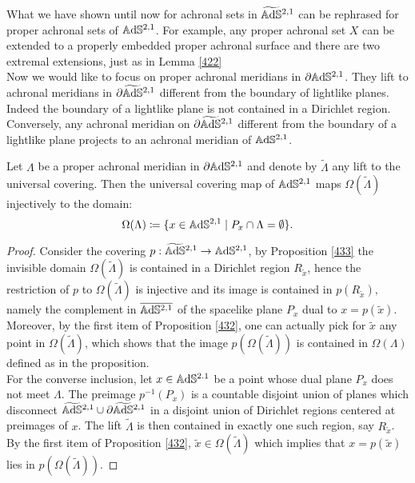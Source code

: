 What we have shown until now for achronal sets in $\widetilde{\mathbb{A}\mathrm{d}\mathbb{S}}{}^{2,1}$ can be rephrased for proper achronal sets of $\mathbb{A}\mathrm{d}\mathbb{S}^{2,1}$. For example, any proper achronal set $X$ can be extended to a properly embedded proper achronal surface and there are two extremal extensions, just as in Lemma \ref{422}\\
Now we would like to focus on proper achronal meridians in $\partial\mathbb{A}\mathrm{d}\mathbb{S}^{2,1}$. They lift to achronal meridians in $\partial\widetilde{\mathbb{A}\mathrm{d}\mathbb{S}}{}^{2,1}$ different from the boundary of lightlike planes. Indeed the boundary of a lightlike plane is not contained in a Dirichlet region. Conversely, any achronal meridian on $\partial\widetilde{\mathbb{A}\mathrm{d}\mathbb{S}}{}^{2,1}$ different from the boundary of a lightlike plane projects to an achronal meridian of $\mathbb{A}\mathrm{d}\mathbb{S}^{2,1}$.

\begin{proposition}\label{453}
    Let $\Lambda$ be a proper achronal meridian in $\partial\mathbb{A}\mathrm{d}\mathbb{S}^{2,1}$ and denote by $\widetilde{\Lambda}$ any lift to the universal covering. Then the universal covering map of $\mathbb{A}\mathrm{d}\mathbb{S}^{2,1}$ maps $\Omega(\widetilde{\Lambda})$ injectively to the domain: 
    \[
        \Omega(\Lambda)\coloneqq \{x\in\mathbb{A}\mathrm{d}\mathbb{S}^{2,1}\;|\;P_x\cap\Lambda=\emptyset\}.
    \]
\end{proposition}
    
\begin{proof}
Consider the covering $p:\widetilde{\mathbb{A}\mathrm{d}\mathbb{S}}{}^{2,1}\to \mathbb{A}\mathrm{d}\mathbb{S}^{2,1}$, by Proposition \ref{433} the invisible domain $\Omega(\widetilde{\Lambda})$ is contained in a Dirichlet region $R_{\widetilde{x}}$, hence the restriction of $p$ to $\Omega(\widetilde{\Lambda})$ is injective and its image is contained in $p(R_{\widetilde{x}}),$ namely the complement in $\overline{\mathbb{A}\mathrm{d}\mathbb{S}^{2,1}}$ of the spacelike plane $P_x$ dual to $x=p(\widetilde{x})$. Moreover, by the first item of Proposition \ref{432}, one can actually pick for $\widetilde{x}$ any point in $\Omega(\widetilde{\Lambda})$, which shows that the image $p(\Omega(\widetilde{\Lambda}))$ is contained in $\Omega(\Lambda)$ defined as in the proposition. \\ 
For the converse inclusion, let $x\in\mathbb{A}\mathrm{d}\mathbb{S}^{2.1}$ be a point whose dual plane $P_x$ does not meet $\Lambda$. The preimage $p^{-1}(P_x)$ is a countable disjoint union of planes which disconnect $\widetilde{\mathbb{A}\mathrm{d}\mathbb{S}}{}^{2,1}\cup \partial\widetilde{\mathbb{A}\mathrm{d}\mathbb{S}}{}^{2,1}$ in a disjoint union of Dirichlet regions centered at preimages of $x$. The lift $\widetilde{\Lambda}$ is then contained in exactly one such region, say $R_{\widetilde{x}}$. By the first item of Proposition \ref{432}, $\widetilde{x}\in\Omega(\widetilde{\Lambda})$ which implies that   $x=p(\widetilde{x})$ lies in $p(\Omega(\widetilde{\Lambda}))$. 
\end{proof}


